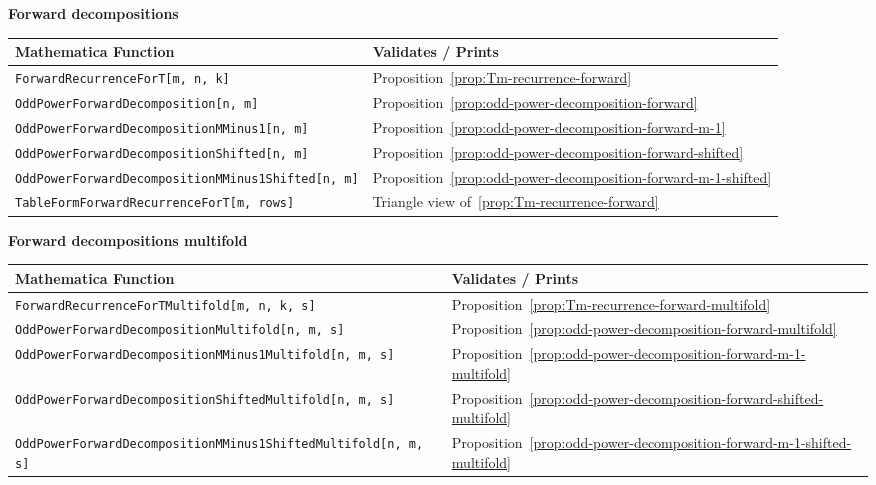 \clearpage

\textbf{Forward decompositions}
\begin{center}
    \renewcommand{\arraystretch}{1.3}
    \begin{tabular}{ll}
        \toprule
        \textbf{Mathematica Function}                             & \textbf{Validates / Prints}                                        \\
        \midrule
        \texttt{ForwardRecurrenceForT[m, n, k]}                   & Proposition~\ref{prop:Tm-recurrence-forward}                       \\
        \texttt{OddPowerForwardDecomposition[n, m]}               & Proposition~\ref{prop:odd-power-decomposition-forward}             \\
        \texttt{OddPowerForwardDecompositionMMinus1[n, m]}        & Proposition~\ref{prop:odd-power-decomposition-forward-m-1}         \\
        \texttt{OddPowerForwardDecompositionShifted[n, m]}        & Proposition~\ref{prop:odd-power-decomposition-forward-shifted}     \\
        \texttt{OddPowerForwardDecompositionMMinus1Shifted[n, m]} & Proposition~\ref{prop:odd-power-decomposition-forward-m-1-shifted} \\
        \texttt{TableFormForwardRecurrenceForT[m, rows]}          & Triangle view of~\ref{prop:Tm-recurrence-forward}                  \\
        \bottomrule
    \end{tabular}
\end{center}

\clearpage

\textbf{Forward decompositions multifold}
\begin{center}
    \renewcommand{\arraystretch}{1.3}
    \begin{tabular}{ll}
        \toprule
        \textbf{Mathematica Function}                                         & \textbf{Validates / Prints}                                                  \\
        \midrule
        \texttt{ForwardRecurrenceForTMultifold[m, n, k, s]}                   & Proposition~\ref{prop:Tm-recurrence-forward-multifold}                       \\
        \texttt{OddPowerForwardDecompositionMultifold[n, m, s]}               & Proposition~\ref{prop:odd-power-decomposition-forward-multifold}             \\
        \texttt{OddPowerForwardDecompositionMMinus1Multifold[n, m, s]}        & Proposition~\ref{prop:odd-power-decomposition-forward-m-1-multifold}         \\
        \texttt{OddPowerForwardDecompositionShiftedMultifold[n, m, s]}        & Proposition~\ref{prop:odd-power-decomposition-forward-shifted-multifold}     \\
        \texttt{OddPowerForwardDecompositionMMinus1ShiftedMultifold[n, m, s]} & Proposition~\ref{prop:odd-power-decomposition-forward-m-1-shifted-multifold} \\
        \bottomrule
    \end{tabular}
\end{center}

